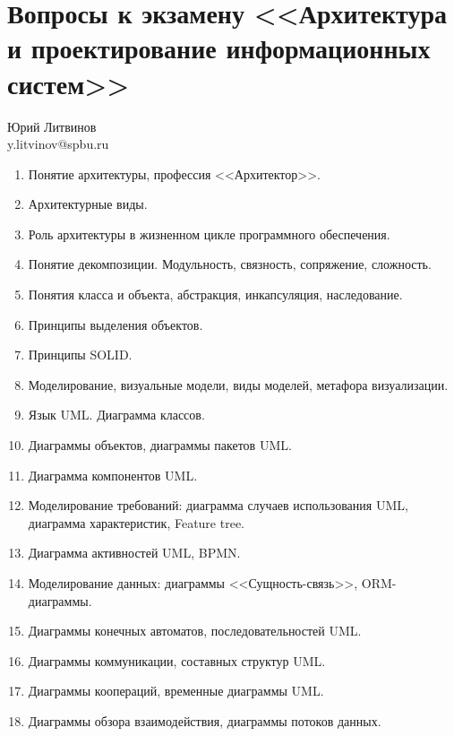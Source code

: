 \documentclass[a5paper]{article}
\begin{document}
\thispagestyle{empty}

\section*{Вопросы к экзамену <<Архитектура и проектирование информационных систем>>}

\begin{flushright}\begin{small}Юрий Литвинов\\\small{y.litvinov@spbu.ru}\end{small}\end{flushright}

\begin{enumerate}
    \item Понятие архитектуры, профессия <<Архитектор>>.
    \item Архитектурные виды.
    \item Роль архитектуры в жизненном цикле программного обеспечения.
    \item Понятие декомпозиции. Модульность, связность, сопряжение, сложность.
    \item Понятия класса и объекта, абстракция, инкапсуляция, наследование. 
    \item Принципы выделения объектов.
    \item Принципы SOLID. %
    \item Моделирование, визуальные модели, виды моделей, метафора визуализации.
    \item Язык UML. Диаграмма классов.
    \item Диаграммы объектов, диаграммы пакетов UML.
    \item Диаграмма компонентов UML.
    \item Моделирование требований: диаграмма случаев использования UML, диаграмма характеристик, Feature tree.
    \item Диаграмма активностей UML, BPMN.
    \item Моделирование данных: диаграммы <<Сущность-связь>>, ORM-диаграммы.
    \item Диаграммы конечных автоматов, последовательностей UML.
    \item Диаграммы коммуникации, составных структур UML.
    \item Диаграммы коопераций, временные диаграммы UML.
    \item Диаграммы обзора взаимодействия, диаграммы потоков данных.

\end{enumerate}
\end{document}
